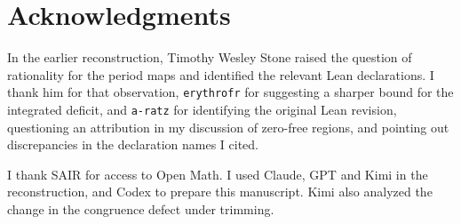 \section*{Acknowledgments}

In the earlier reconstruction, Timothy Wesley Stone raised the question
of rationality for the period maps and identified the relevant Lean
declarations. I thank him for that observation, \texttt{erythrofr} for
suggesting a sharper bound for the integrated deficit, and \texttt{a-ratz}
for identifying the original Lean revision, questioning an attribution
in my discussion of zero-free regions, and pointing out discrepancies in the
declaration names I cited.

I thank SAIR for access to Open Math. I used Claude, GPT and Kimi in
the reconstruction, and Codex to prepare this manuscript. Kimi also
analyzed the change in the congruence defect under trimming.
